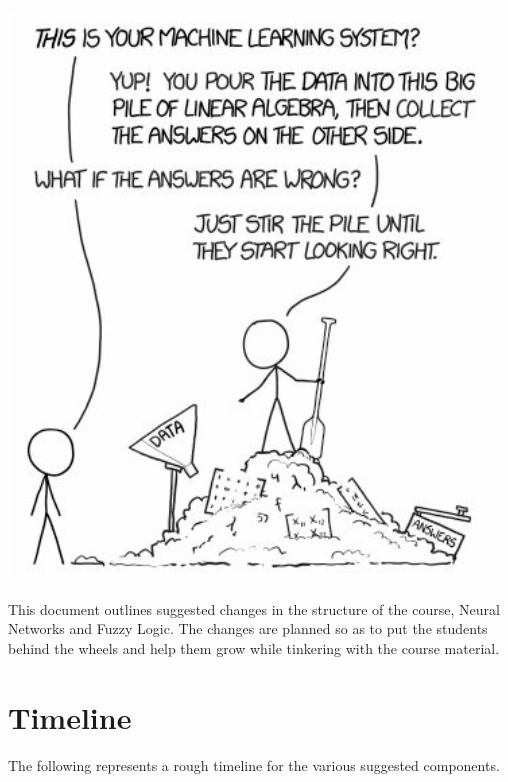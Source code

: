 \documentclass{article} %
\begin{document}
\begin{center}
    \includegraphics[width=0.8\linewidth]{1.png}
\end{center}

This document outlines suggested changes in the structure
of the course, Neural Networks and Fuzzy Logic.
The changes are planned so as to put the students
behind the wheels and help them grow while
tinkering with the course material.

\section{Timeline}

The following represents a rough timeline for the
various suggested components.
\end{document}
